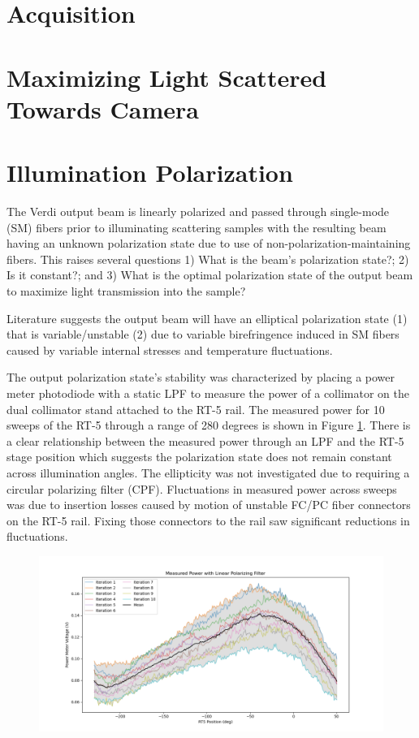 \section{Acquisition}

\section{Maximizing Light Scattered Towards Camera}

\section{Illumination Polarization}
The Verdi output beam is linearly polarized and passed through single-mode (SM) fibers prior to illuminating scattering samples with the resulting beam having an unknown polarization state due to use of non-polarization-maintaining fibers. This raises several questions 1) What is the beam's polarization state?; 2) Is it constant?; and 3) What is the optimal polarization state of the output beam to maximize light transmission into the sample?

Literature suggests the output beam will have an elliptical polarization state (1) that is variable/unstable (2) due to variable birefringence induced in SM fibers caused by variable internal stresses and temperature fluctuations.

The output polarization state's stability was characterized by placing a power meter photodiode with a static LPF to measure the power of a collimator on the dual collimator stand attached to the RT-5 rail. The measured power for 10 sweeps of the RT-5 through a range of 280 degrees is shown in Figure \ref{fig:lpfpwr_RT5}. There is a clear relationship between the measured power through an LPF and the RT-5 stage position which suggests the polarization state does not remain constant across illumination angles. The ellipticity was not investigated due to requiring a circular polarizing filter (CPF). Fluctuations in measured power across sweeps was due to insertion losses caused by motion of unstable FC/PC fiber connectors on the RT-5 rail. Fixing those connectors to the rail saw significant reductions in fluctuations.

\begin{figure}
    \centering
    \includegraphics[width=\linewidth]{figures/LPFpwr_vs_RT5.png}
    \caption{}
    \label{fig:lpfpwr_RT5}
\end{figure}

